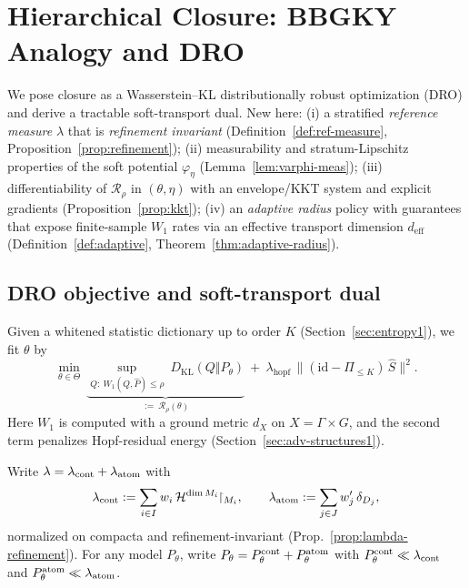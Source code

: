 \section{Hierarchical Closure: BBGKY Analogy and DRO}\label{sec:closure1}

We pose closure as a Wasserstein--KL distributionally robust optimization (DRO) and derive a tractable soft-transport dual. New here:
(i) a stratified \emph{reference measure} $\lambda$ that is \emph{refinement invariant} (Definition~\ref{def:ref-measure}, Proposition~\ref{prop:refinement});
(ii) measurability and stratum-Lipschitz properties of the soft potential $\varphi_\eta$ (Lemma~\ref{lem:varphi-meas});
(iii) differentiability of $\mathcal R_\rho$ in $(\theta,\eta)$ with an envelope/KKT system and explicit gradients (Proposition~\ref{prop:kkt});
(iv) an \emph{adaptive radius} policy with guarantees that expose finite-sample $W_1$ rates via an effective transport dimension $d_{\mathrm{eff}}$ (Definition~\ref{def:adaptive}, Theorem~\ref{thm:adaptive-radius}).

\subsection{DRO objective and soft-transport dual}

Given a whitened statistic dictionary up to order $K$ (Section~\ref{sec:entropy1}), we fit $\theta$ by
\begin{equation}\label{eq:DRO}
\min_{\theta\in\Theta}\ \underbrace{\sup_{Q:\ W_1(Q,\hat P)\le \rho}\ D_{\mathrm{KL}}(Q\Vert P_\theta)}_{:=\ \mathcal R_\rho(\theta)}\ +\ \lambda_{\mathrm{hopf}}\,\big\|(\mathrm{id}-\Pi_{\le K})\,\hat S\big\|^2.
\end{equation}
Here $W_1$ is computed with a ground metric $d_X$ on $X=\Gamma\times G$, and the second term penalizes Hopf-residual energy (Section~\ref{sec:adv-structures1}).

\begin{definition}\label{def:ref-measure}
Write $\lambda=\lambda_{{\mathrm{cont}}}+\lambda_{{\mathrm{atom}}}$ with
\[
\lambda_{{\mathrm{cont}}}:=\sum_{i\in I} w_i\,\mathcal H^{\dim M_i}\!\!\restriction_{M_i},\qquad
\lambda_{{\mathrm{atom}}}:=\sum_{j\in J} w'_j\,\delta_{D_j},
\]
normalized on compacta and refinement-invariant (Prop.~\ref{prop:lambda-refinement}). 
For any model $P_\theta$, write $P_\theta=P^{{\mathrm{cont}}}_\theta+P^{{\mathrm{atom}}}_\theta$ with $P^{{\mathrm{cont}}}_\theta\ll\lambda_{{\mathrm{cont}}}$ and $P^{{\mathrm{atom}}}_\theta\ll\lambda_{{\mathrm{atom}}}$.
\end{definition}

